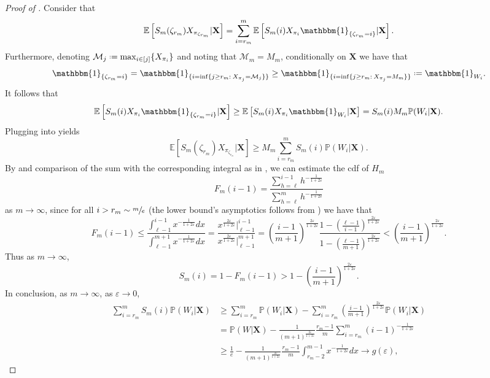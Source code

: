 \documentclass[11pt, a4paper, twoside]{article}
\newcommand*{\defeq}{\mathrel{\vcenter{\baselineskip0.5ex \lineskiplimit0pt
			\hbox{\scriptsize.}\hbox{\scriptsize.}}}=}
\newcommand{\eps}{\varepsilon}
\newcommand{\EE}{\mathbb{E}}
\newcommand{\PP}{\mathbb{P}}
\newcommand{\XX}{\mathbf{X}}
\newcommand{\II}{\mathbbm{1}}
\numberwithin{equation}{section}
\begin{document}
\begin{proof}[Proof of ]
		Consider that 
		\begin{equation}\label{discountconditional}
			\EE\left[S_m(\zeta_{r_m})X_{\pi_{\zeta_{r_m}}}|\XX\right]=\sum_{i=r_m}^m \EE\left[S_m(i)X_{\pi_i}\II_{\{\zeta_{r_m}=i\}}|\XX\right].
		\end{equation}
		Furthermore, denoting $\mathcal{M}_j\defeq\max_{i\in[j]}\{X_{\pi_i}\}$ and noting that $\mathcal{M}_m=M_m$, conditionally on $\XX$ we have that
		\[\II_{\{\zeta_{r_m}=i\}}=\II_{\{i=\inf\{j\ge r_m:\:X_{\pi_j}=\mathcal{M}_j\}\}}\ge\II_{\{i=\inf\{j\ge r_m:\:X_{\pi_j}=M_m\}\}}\defeq\II_{W_i}.\]
		It follows that
		\begin{equation}\label{lowerconditional1}
			\EE\left[S_m(i)X_{\pi_i}\II_{\{\zeta_{r_m}=i\}}|\XX\right]\ge \EE\left[S_m(i)X_{\pi_i}\II_{W_i}|\XX\right]=S_m(i)M_m\PP(W_i|\XX).
		\end{equation}
		Plugging  into  yields
		\begin{equation}\label{lowerconditional2}
			\EE\left[S_m(\zeta_{r_m})X_{\pi_{\zeta_{r_m}}}|\XX\right]\ge M_m\sum_{i=r_m}^m S_m(i)\PP(W_i|\XX).
		\end{equation}
		By  and comparison of the sum with the corresponding integral as in , we can estimate the cdf of $H_m$ \[F_m(i-1)=\frac{\sum_{h=\ell}^{i-1} h^{-\frac{1}{1+2\eps}}}{\sum_{h=\ell}^{m} h^{-\frac{1}{1+2\eps}}}\] as  $m\longrightarrow\infty$, since for all $i>r_m\sim\sfrac{m}{e}$ (the lower bound's asymptotics follows from ) we have that
		\begin{equation}\label{const}
			F_m(i-1)\le \frac{\int_{\ell-1}^{i-1} x^{-\frac{1}{1+2\eps}}dx}{\int_{\ell-1}^{m+1} x^{-\frac{1}{1+2\eps}}dx}=\frac{x^{\frac{2\eps}{1+2\eps}}\Big\vert_{\ell-1}^{i-1}}{x^{\frac{2\eps}{1+2\eps}}\Big\vert_{\ell-1}^{m+1}}=\left(\frac{i-1}{m+1}\right)^{\frac{2\eps}{1+2\eps}}\frac{1-\left(\frac{\ell-1}{i-1}\right)^{\frac{2\eps}{1+2\eps}}}{1-\left(\frac{\ell-1}{m+1}\right)^{\frac{2\eps}{1+2\eps}}}<\left(\frac{i-1}{m+1}\right)^{\frac{2\eps}{1+2\eps}}.
		\end{equation}
		Thus as $m\longrightarrow\infty$, \[S_m(i)=1-F_m(i-1)>1- \left(\frac{i-1}{m+1}\right)^{\frac{2\eps}{1+2\eps}}.\]
		In conclusion, as $m\longrightarrow\infty$, as $\eps\longrightarrow0$,
		\begin{align*}
			\sum_{i=r_m}^m S_m(i)\PP(W_i|\XX)&\ge \sum_{i=r_m}^m \PP(W_i|\XX)-\sum_{i=r_m}^m \left(\frac{i-1}{m+1}\right)^{\frac{2\eps}{1+2\eps}}\PP(W_i|\XX)\\&=\PP(W|\XX)-\frac{1}{(m+1)^{\frac{2\eps}{1+2\eps}}}\frac{r_m-1}{m}\sum_{i=r_m}^m \left(i-1\right)^{-\frac{1}{1+2\eps}}\\&\ge\frac{1}{e}-\frac{1}{(m+1)^{\frac{2\eps}{1+2\eps}}}\frac{r_m-1}{m}\int_{r_m-2}^{m-1} x^{-\frac{1}{1+2\eps}}dx\longrightarrow g(\eps),

\end{align*}
\end{proof}
\end{document}
